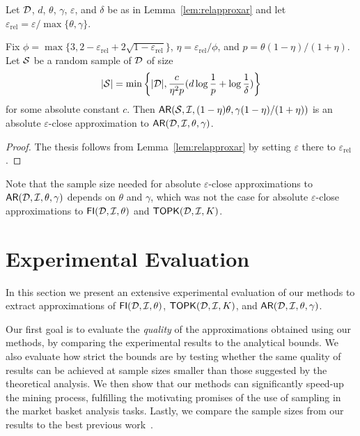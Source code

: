 \begin{lemma}\label{lem:absapproxar}
Let ${\cal D}$, $d$, $\theta$, $\gamma$, $\varepsilon$, and $\delta$ be as in
Lemma~\ref{lem:relapproxar}
and let $\varepsilon_\mathrm{rel}=\varepsilon/\max\{\theta,\gamma\}$.

Fix
$\phi=\max\{3,2-\varepsilon_\mathrm{rel}+2\sqrt{1-\varepsilon_\mathrm{rel}}\}$,
$\eta=\varepsilon_\mathrm{rel}/\phi$,
and $p=\theta(1-\eta)/(1+\eta)$. Let ${\cal S}$ be a random sample of ${\cal D}$ of
size 
\[
|{\cal S}|=\min\left\{|{\cal D}|,\frac{c}{\eta^2p}(d\log\frac{1}{p}+\log\frac{1}{\delta})\right\}\]
for some absolute constant $c$. Then
$\mathsf{AR}({\cal S},{\cal I},(1-\eta)\theta,\gamma(1-\eta)/(1+\eta))$ is an absolute
$\varepsilon$-close approximation to $\mathsf{AR}({\cal D},{\cal I},\theta,\gamma)$.
\end{lemma}

\begin{proof}
  The thesis follows from Lemma~\ref{lem:relapproxar} by setting $\varepsilon$
  there to $\varepsilon_\mathrm{rel}$.
\end{proof}

Note that the sample size needed for absolute $\varepsilon$-close
approximations to $\mathsf{AR}({\cal D},{\cal I},\theta,\gamma)$ depends on $\theta$ and
$\gamma$, which was not the case for absolute $\varepsilon$-close approximations
to $\mathsf{FI}({\cal D},{\cal I},\theta)$ and $\mathsf{TOPK}({\cal D},{\cal I},K)$.

\section{Experimental Evaluation}\label{sec:vcmineexp}
In this section we present an extensive experimental evaluation of
our methods to extract approximations of $\mathsf{FI}({\cal D},{\cal I},\theta)$, $\mathsf{TOPK}({\cal D},{\cal I},K)$, and
$\mathsf{AR}({\cal D},{\cal I},\theta,\gamma)$.

Our first goal is to evaluate the \emph{quality} of the
approximations obtained using our methods, by comparing the experimental results 
to the analytical bounds. We also evaluate how strict the bounds are
 by testing whether the same quality of results can be
achieved at sample sizes smaller than those suggested by the theoretical analysis. 
We then show that our methods can significantly speed-up the mining process,
fulfilling the motivating promises of the use of sampling in the market basket
analysis tasks. Lastly, we compare the sample sizes from our results to the best
previous work~\citep{ChakaravarthyPS09}.

